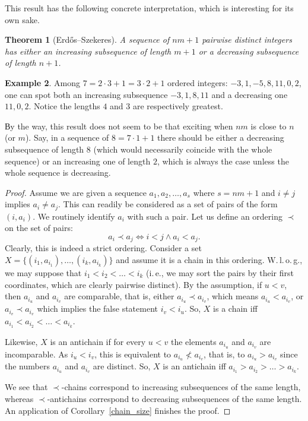 \documentclass[12pt,notitlepage]{article}
\theoremstyle{plain}
\newtheorem{thm}{Theorem}[section]
\theoremstyle{definition}
\newtheorem{exm}[thm]{Example}
\theoremstyle{plain}
\newcommand{\1}{\mathbf{1}}
\newcommand{\0}{\mathbf{0}}
\begin{document}
This result has the following concrete interpretation, which is interesting for its own sake.
\begin{thm}[Erd\H{o}s--Szekeres]
A sequence of $nm + 1$ pairwise distinct integers has either an increasing subsequence of length $m + 1$ or a decreasing subsequence of length $n + 1$.
\end{thm}
\begin{exm} Among $7 = 2 \cdot 3 + 1 = 3 \cdot 2 + 1$ ordered integers: $-3, 1, -5, 8, 11, 0, 2$, one can spot both an increasing subsequence $-3, 1, 8, 11$ and a decreasing one $11, 0, 2$. Notice the lengths $4$ and $3$ are respectively greatest.

Вy the way, this result does not seem to be that exciting when $n m$ is close to $n$ (or $m$). Say, in a sequence of $8 = 7\cdot1 + 1$ there should be either a decreasing subsequence of length $8$ (which would necessarily coincide with the whole sequence) or an increasing one of length $2$, which is always the case unless the whole sequence is decreasing.
\end{exm}
\begin{proof}
Assume we are given a sequence $a_1, a_2, \ldots, a_s$ where $s = nm + 1$ and $i \neq j$ implies $a_i \neq a_j$. This can readily be considered as a set of pairs of the form $(i, a_i)$. We routinely identify $a_i$ with such a pair. Let us define an ordering $\prec$ on the set of pairs:
$$a_i \prec a_j \iff i < j \wedge a_i < a_j.$$
Clearly, this is indeed a strict ordering.  Consider a set $X = \{ (i_1, a_{i_1}),\ldots, (i_k, a_{i_k}) \}$ and assume it is a chain in this ordering. W.\,l.\,o.\,g., we may suppose that $i_1 < i_2 < \ldots < i_k$ (i.\,e., we may sort the pairs by their first coordinates, which are clearly pairwise distinct). By the assumption, if $u < v$, then $a_{i_u}$ and $a_{i_v}$ are comparable, that is, either $a_{i_u} \prec a_{i_v}$, which means $a_{i_u} < a_{i_v}$, or $a_{i_v} \prec a_{i_v}$ which implies the false statement $i_v < i_u$. So, $X$ is a chain iff $a_{i_1} < a_{i_2} < \ldots < a_{i_k}$.

Likewise, $X$ is an antichain if for every $u < v$ the elements $a_{i_u}$ and $a_{i_v}$ are incomparable. As $i_u < i_v$, this is equivalent to $a_{i_u} \nless a_{i_v}$, that is, to $a_{i_u} > a_{i_v}$ since the numbers $a_{i_u}$ and $a_{i_v}$ are distinct. So, $X$ is an antichain iff $a_{i_1} > a_{i_2} > \ldots > a_{i_k}$.

We see that ${\prec}$-chains correspond to increasing subsequences of the same length, whereas ${\prec}$-antichains correspond to decreasing subsequences of the same length. An application of Corollary~\ref{chain_size} finishes the proof.
\end{proof} 
\end{document}
